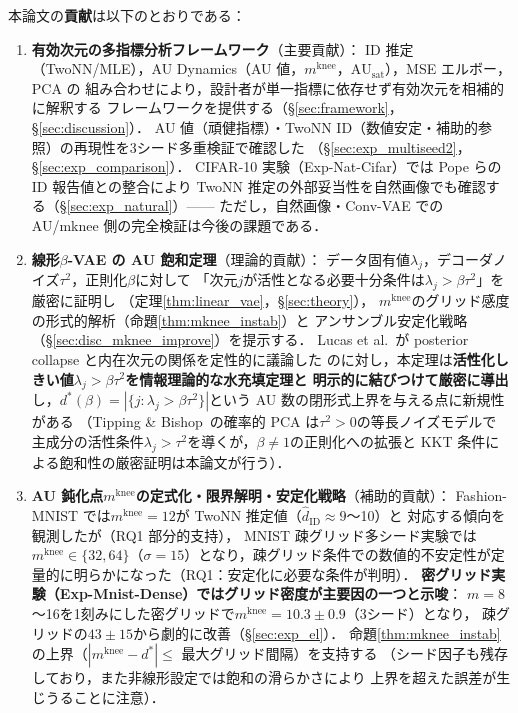 \documentclass[11pt,a4paper]{jsarticle}
\newcommand{\AUsat}{\mathrm{AU}_{\mathrm{sat}}}
\newcommand{\mknee}{m^{\mathrm{knee}}}
\begin{document}
本論文の\textbf{貢献}は以下のとおりである：
\begin{enumerate}
  \item \textbf{有効次元の多指標分析フレームワーク}（主要貢献）：
        ID 推定（TwoNN/MLE），AU Dynamics（AU 値，$\mknee$，$\AUsat$），MSE エルボー，PCA の
        組み合わせにより，設計者が単一指標に依存せず有効次元を相補的に解釈する
        フレームワークを提供する（§\ref{sec:framework}，§\ref{sec:discussion}）．
        AU 値（頑健指標）・TwoNN ID（数値安定・補助的参照）の再現性を3シード多重検証で確認した
        （§\ref{sec:exp_multiseed2}，§\ref{sec:exp_comparison}）．
        CIFAR-10 実験（Exp-Nat-Cifar）では Pope ら\cite{pope2021intrinsic}の ID 報告値との整合により
        TwoNN 推定の外部妥当性を自然画像でも確認する（§\ref{sec:exp_natural}）——
        ただし，自然画像・Conv-VAE での AU/mknee 側の完全検証は今後の課題である．
  \item \textbf{線形$\beta$-VAE の AU 飽和定理}（理論的貢献）：
        データ固有値$\lambda_j$，デコーダノイズ$\tau^2$，正則化$\beta$に対して
        「次元$j$が活性となる必要十分条件は$\lambda_j > \beta\tau^2$」を厳密に証明し
        （定理\ref{thm:linear_vae}，§\ref{sec:theory}），
        $\mknee$のグリッド感度の形式的解析（命題\ref{thm:mknee_instab}）と
        アンサンブル安定化戦略（§\ref{sec:disc_mknee_improve}）を提示する．
        Lucas et al.~\cite{lucas2019elbo}が posterior collapse と内在次元の関係を定性的に議論した
        のに対し，本定理は\textbf{活性化しきい値$\lambda_j > \beta\tau^2$を情報理論的な水充填定理と
        明示的に結びつけて厳密に導出}し，$d^*(\beta) = |\{j:\lambda_j > \beta\tau^2\}|$という
        AU 数の閉形式上界を与える点に新規性がある
        （Tipping \& Bishop~\cite{tippingbishop1999ppca}の確率的 PCA は$\tau^2 > 0$の等長ノイズモデルで
        主成分の活性条件$\lambda_j > \tau^2$を導くが，$\beta \neq 1$の正則化への拡張と
        KKT 条件による飽和性の厳密証明は本論文が行う）．
  \item \textbf{AU 鈍化点$\mknee$の定式化・限界解明・安定化戦略}（補助的貢献）：
        Fashion-MNIST では$\mknee = 12$が TwoNN 推定値（$\hat{d}_\mathrm{ID} \approx 9$〜10）と
        対応する傾向を観測したが（RQ1 部分的支持），
        MNIST 疎グリッド多シード実験では$\mknee \in \{32,64\}$（$\sigma=15$）となり，疎グリッド条件での数値的不安定性が定量的に明らかになった（RQ1：安定化に必要な条件が判明）．
        \textbf{密グリッド実験（Exp-Mnist-Dense）ではグリッド密度が主要因の一つと示唆}：
        $m=8$〜16を1刻みにした密グリッドで$\mknee = 10.3 \pm 0.9$（3シード）となり，
        疎グリッドの$43 \pm 15$から劇的に改善（§\ref{sec:exp_el}）．
        命題\ref{thm:mknee_instab}の上界（$|\mknee - d^*| \leq$ 最大グリッド間隔）を支持する
        （シード因子も残存しており，また非線形設定では飽和の滑らかさにより
        上界を超えた誤差が生じうることに注意）．
\end{enumerate}
\end{document}
